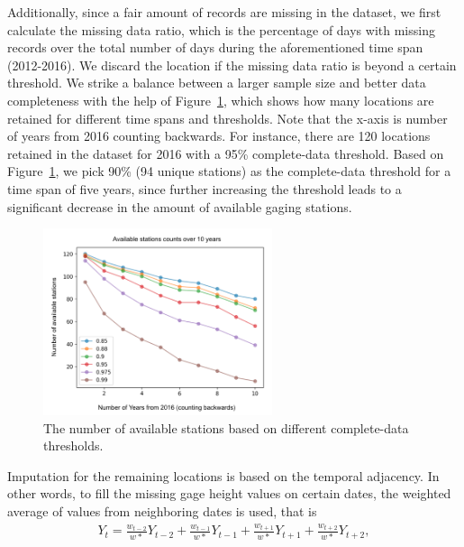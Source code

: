 \documentclass{svjour3}
\renewcommand\hl[1]{#1}
\begin{document}
Additionally, since a fair amount of records are missing in the dataset, we first calculate the   missing data ratio, which is the percentage of days with missing records over the total number of days during the aforementioned time span (2012-2016).
We discard the location if the missing data ratio is beyond a certain threshold.
We strike a balance between a larger sample size and better data completeness with the help of Figure~\ref{missing_data}, which shows how many locations are retained for different time spans and thresholds.
Note that the x-axis is number of years from 2016 counting backwards.
For instance, there are 120 locations retained in the dataset for 2016 with a 95\% complete-data threshold.
Based on Figure~\ref{missing_data}, we pick 90\% (94 unique stations) as the complete-data threshold for a time span of five years, since further increasing the threshold leads to a significant decrease in the amount of available gaging stations. \\

\begin{figure}[htbp]
\begin{center}
\includegraphics[width=0.6\textwidth]{../images/station_counts_by_year.png}
\caption{\hl{The number of available stations based on different complete-data thresholds.}}
\label{missing_data}
\end{center}
\end{figure}

Imputation for the remaining locations is based on the temporal adjacency.
In other words, to fill the missing gage height values on certain dates, the weighted average of values from neighboring dates is used, that is
\begin{align*}
  Y_t = \frac{w_{t-2}}{w*} Y_{t-2} + \frac{w_{t-1}}{w*}Y_{t-1} + \frac{w_{t+1}}{w*}Y_{t+1} + \frac{w_{t+2}}{w*}Y_{t+2},
\end{align*}
\end{document}

